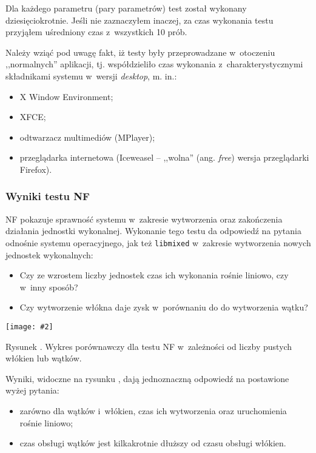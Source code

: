 \documentclass[12pt]{mwart}
\newcommand{\code}{\texttt}
\newcounter{figmain}
\newcommand{\myownfigure}[4]{ \newcounter{#1} \setcounter{#1}{\value{figmain}} \addtocounter{figmain}{1} \begin{center} \label{fig:#1} \centering \texttt{[image: \#2]}\\ \nopagebreak[5] \parbox[t]{11.5cm}{Rysunek \arabic{#1}. #3.} \end{center}}
\begin{document}
\par
\indent
  Dla każdego parametru (pary parametrów) test został wykonany dziesięciokrotnie. Jeśli nie zaznaczyłem inaczej, za czas wykonania testu przyjąłem uśredniony 
  czas z~wszystkich 10 prób.
\par
\indent
  Należy wziąć pod uwagę fakt, iż testy były przeprowadzane w~otoczeniu ,,normalnych'' aplikacji, tj. współdzieliło czas wykonania z~charakterystycznymi składnikami
  systemu w~wersji \emph{desktop}, m. in.:
  \begin{itemize}
    \item X Window Environment;
    \item XFCE;
    \item odtwarzacz multimediów  (MPlayer);
    \item przeglądarka internetowa (Iceweasel -- ,,wolna'' (ang. \emph{free}) wersja przeglądarki Firefox).
  \end{itemize}
\par
\newpage
\subsubsection{Wyniki testu NF}
\indent
  NF pokazuje sprawność systemu w~zakresie wytworzenia oraz zakończenia działania jednostki wykonalnej.
  Wykonanie tego testu da odpowiedź na pytania odnośnie systemu operacyjnego, jak też \code{libmixed} w~zakresie
  wytworzenia nowych jednostek wykonalnych:
  \begin{itemize}
    \item Czy ze wzrostem liczby jednostek czas ich wykonania rośnie liniowo, czy w~inny sposób?
    \item Czy wytworzenie włókna daje zysk w~porównaniu do do wytworzenia wątku?
  \end{itemize}
\par
\indent
\myownfigure{nullfork}{nullfork.pdf}{Wykres porównawczy dla testu NF w~zależności od liczby pustych włókien lub wątków}{1.16} 
\par
\indent
Wyniki, widoczne na rysunku , dają jednoznaczną odpowiedź na postawione wyżej pytania: 
  \begin{itemize}
    \item zarówno dla wątków i~włókien, czas ich wytworzenia oraz uruchomienia rośnie liniowo;
    \item czas obsługi wątków jest kilkakrotnie dłuższy od czasu obsługi włókien.
  \end{itemize}
\par
%
\newpage
\end{document}
